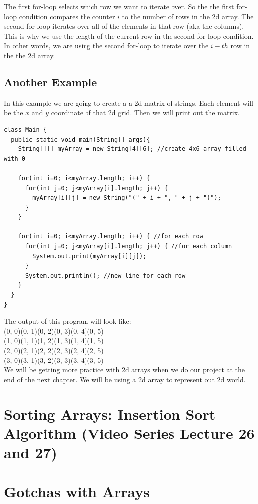 \documentclass[11]{article}
\begin{document}
The first for-loop selects which row we want to iterate over. So the the first for-loop condition compares the counter $i$ to the number of rows in the 2d array. The second for-loop iterates over all of the elements in that row (aka the columns). This is why we use the length of the current row in the second for-loop condition. In other words, we are using the second for-loop to iterate over the $i-th$ row in the the 2d array.

\subsection{Another Example}
In this example we are going to create a a 2d matrix of strings. Each element will be the $x$ and $y$ coordinate of that 2d grid. Then we will print out the matrix.

\begin{lstlisting}
class Main {
  public static void main(String[] args){
    String[][] myArray = new String[4][6]; //create 4x6 array filled with 0

    for(int i=0; i<myArray.length; i++) {
      for(int j=0; j<myArray[i].length; j++) {
        myArray[i][j] = new String("(" + i + ", " + j + ")");
      }
    }

    for(int i=0; i<myArray.length; i++) { //for each row
      for(int j=0; j<myArray[i].length; j++) { //for each column
        System.out.print(myArray[i][j]);
      }
      System.out.println(); //new line for each row
    } 
  }
}
\end{lstlisting}

The output of this program will look like:\\
(0, 0)(0, 1)(0, 2)(0, 3)(0, 4)(0, 5)\\(1, 0)(1, 1)(1, 2)(1, 3)(1, 4)(1, 5)\\(2, 0)(2, 1)(2, 2)(2, 3)(2, 4)(2, 5)\\(3, 0)(3, 1)(3, 2)(3, 3)(3, 4)(3, 5)\\

We will be getting more practice with 2d arrays when we do our project at the end of the next chapter. We will be using a 2d array to represent out 2d world.

\section{Sorting Arrays: Insertion Sort Algorithm (Video Series Lecture 26 and 27)}
\section{Gotchas with Arrays}
\label{sec:gotchas}
\end{document}
